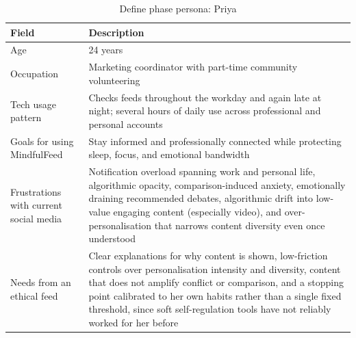 \documentclass[11pt]{article}
\begin{document}
\begin{table}[H]
\centering
\caption{Define phase persona: Priya}
\label{tab:persona_priya}
\small
\begin{tabular}{p{4cm}p{9.5cm}}
\hline
\textbf{Field} & \textbf{Description} \\
\hline
Age & 24 years \\
Occupation & Marketing coordinator with part-time community volunteering \\
Tech usage pattern & Checks feeds throughout the workday and again late at night; several hours of daily use across professional and personal accounts \\
Goals for using MindfulFeed & Stay informed and professionally connected while protecting sleep, focus, and emotional bandwidth \\
Frustrations with current social media & Notification overload spanning work and personal life, algorithmic opacity, comparison-induced anxiety, emotionally draining recommended debates, algorithmic drift into low-value engaging content (especially video), and over-personalisation that narrows content diversity even once understood \\
Needs from an ethical feed & Clear explanations for why content is shown, low-friction controls over personalisation intensity and diversity, content that does not amplify conflict or comparison, and a stopping point calibrated to her own habits rather than a single fixed threshold, since soft self-regulation tools have not reliably worked for her before \\
\hline
\end{tabular}
\end{table}
\end{document}
